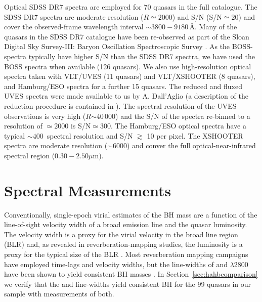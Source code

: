 Optical SDSS DR7 spectra are employed for 70 quasars in the full catalogue.  
The SDSS DR7 spectra are moderate resolution ($R$$\simeq2000$) and S/N (S/N$\simeq20$) and cover the observed-frame wavelength interval $\sim3800-9180$\,\AA.
Many of the quasars in the SDSS DR7 catalogue have been re-observed as part of the Sloan Digital Sky Survey-III: Baryon Oscillation Spectroscopic Survey \citep[SDSS-III/BOSS;][]{dawson13}. 
As the BOSS-spectra typically have higher S/N than the SDSS DR7 spectra, we have used the BOSS spectra when available (126 quasars).  
We also use high-resolution optical spectra taken with VLT/UVES (11 quasars) and VLT/XSHOOTER (8 quasars), and Hamburg/ESO spectra for a further 15 quasars. 
The reduced and fluxed UVES spectra were made available to us by A. Dall'Aglio (a description of the reduction procedure is contained in \citet{dallaglio08}).
The spectral resolution of the UVES observations is very high ($R$$\sim$40\,000) and the S/N of the spectra re-binned to a resolution of $\simeq2000$ is S/N$\simeq300$.  
The Hamburg/ESO optical spectra have a typical $\sim400$\kms\, spectral resolution and S/N $\gtrsim$ 10 per pixel. 
The XSHOOTER spectra are moderate resolution ($\sim6000$) and conver the full optical-near-infrared spectral region ($0.30-2.50\mu$m). 

\section{Spectral Measurements}
\label{sec:spec_measures}

Conventionally, single-epoch virial estimates of the BH mass are a function of the line-of-sight velocity width of a broad emission line and the quasar luminosity. 
The velocity width is a proxy for the virial velocity in the broad line region (BLR) and, as revealed in reverberation-mapping studies, the luminosity is a proxy for the typical size of the BLR \citep[the $R-L$ relation; e.g.][]{kaspi00,kaspi07}. 
Most reverberation mapping campaigns have employed \hb time-lags and velocity widths, but the line-widths of \ha and $\lambda$2800 have been shown to yield consistent BH masses \citep[e.g.][]{mclure02,greene05,onken08,shen08,wang09,rafiee11,mejia-restrepo16}. 
In Section~\ref{sec:hahbcomparison} we verify that the \ha and \hb line-widths yield consistent BH for the 99 quasars in our sample with measurements of both.     

